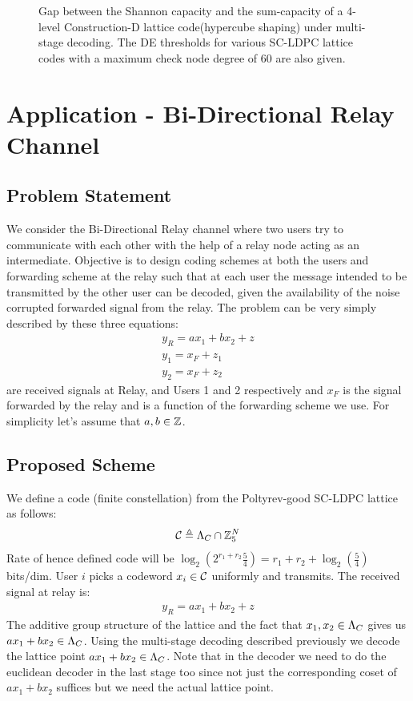 \documentclass[journal,twocolumn]{IEEEtran}
\begin{document}
\begin{figure}
\centering
\setlength{}
\setlength{}

\caption{Gap between the Shannon capacity and the sum-capacity of a 4-level Construction-D lattice code(hypercube shaping) under multi-stage decoding. The DE thresholds for various SC-LDPC lattice codes with a maximum check node degree of $60$ are also given.}	
\label{Fig:ShapingLoss}	
\end{figure}

\section{Application - Bi-Directional Relay Channel}
\subsection{Problem Statement}
We consider the Bi-Directional Relay channel where two users try to communicate with each other with the help of a relay node acting as an intermediate. Objective is to design coding schemes at both the users and forwarding scheme at the relay such that at each user the message intended to be transmitted by the other user can be decoded, given the availability of the noise corrupted forwarded signal from the relay.
The problem can be very simply described by these three equations: 
\begin{align*}
y_{R}=a x_{1}+b x_{2}+z \\
y_{1}=x_{F}+z_{1} \\
y_{2}=x_{F}+z_{2} 
\end{align*}
 are received signals at Relay, and Users 1 and 2 respectively and $x_{F}$ is the signal forwarded by the relay and is a function of the  forwarding scheme we use. For simplicity let's assume that $a,b\in \mathbb{Z}$.

\subsection{Proposed Scheme}
We define a code (finite constellation) from the Poltyrev-good SC-LDPC lattice as follows:
\begin{equation}
\mathcal{C}\triangleq \Lambda_{C}\cap \mathbb{Z}_{5}^{N}
\end{equation}
Rate of hence defined code will be $\log_{2}(2^{r_{1}+r_{2}}\frac{5}{4})=r_{1}+r_{2}+\log_{2}(\frac{5}{4})$ bits/dim. User $i$ picks a codeword $x_{i}\in\mathcal{C}$ uniformly and transmits. The received signal at relay is:
\begin{align*}
y_{R}=a x_{1}+b x_{2} +z
\end{align*}
The additive group structure of the lattice and the fact that $x_{1},x_{2}\in \Lambda_{C}$ gives us $a x_{1}+b x_{2}\in \Lambda_{C}$. Using the multi-stage decoding described previously we decode the lattice point $a x_{1} + b x_{2}\in \Lambda_{C}$. Note that in the decoder we need to do the euclidean decoder in the last stage too since not just the corresponding coset of $a x_{1}+b x_{2}$ suffices but we need the actual lattice point.
\end{document}
